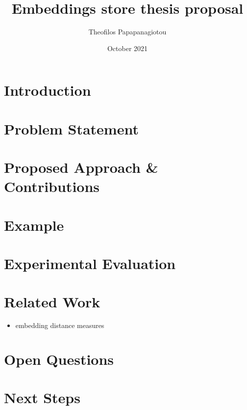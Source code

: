 \documentclass{article}
\title{Embeddings store thesis proposal}
\author{Theofilos Papapanagiotou}
\date{October 2021}
\begin{document}
\maketitle


\section{Introduction}
\section{Problem Statement}
\section{Proposed Approach \& Contributions}
\section{Example}
\section{Experimental Evaluation}
\section{Related Work}
\begin{itemize}
    \item embedding distance measures
\end{itemize}
\section{Open Questions}
\section{Next Steps}
\end{document}
